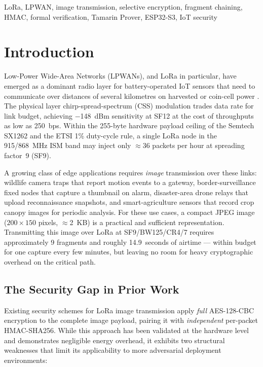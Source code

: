 \documentclass[journal]{IEEEtran}
\begin{document}
\begin{IEEEkeywords}
LoRa, LPWAN, image transmission, selective encryption, fragment chaining,
HMAC, formal verification, Tamarin Prover, ESP32-S3, IoT security
\end{IEEEkeywords}

\section{Introduction}
\label{sec:intro}

Low-Power Wide-Area Networks (LPWANs), and LoRa in particular, have emerged as
a dominant radio layer for battery-operated IoT sensors that need to communicate
over distances of several kilometres on harvested or coin-cell power
\cite{etsi_en300220}.  The physical layer chirp-spread-spectrum (CSS) modulation
trades data rate for link budget, achieving $-$148~dBm sensitivity at SF12 at
the cost of throughputs as low as 250~bps.  Within the 255-byte hardware payload
ceiling of the Semtech SX1262 \cite{semtech_sx1262} and the ETSI 1\%
duty-cycle rule, a single LoRa node in the 915/868~MHz ISM band may inject only
$\approx$36 packets per hour at spreading factor~9 (SF9).

A growing class of edge applications requires \emph{image} transmission over
these links: wildlife camera traps that report motion events to a gateway,
border-surveillance fixed nodes that capture a thumbnail on alarm, disaster-area
drone relays that upload reconnaissance snapshots, and smart-agriculture sensors
that record crop canopy images for periodic analysis.  For these use cases, a
compact JPEG image ($200 \times 150$ pixels, $\approx$2~KB) is a practical and
sufficient representation.  Transmitting this image over LoRa at SF9/BW125/CR4/7
requires approximately 9 fragments and roughly 14.9~seconds of airtime --- within
budget for one capture every few minutes, but leaving no room for heavy
cryptographic overhead on the critical path.

\subsection*{The Security Gap in Prior Work}

Existing security schemes for LoRa image transmission \cite{ryczek2025}
apply \emph{full} AES-128-CBC encryption to the complete image payload, pairing
it with \emph{independent} per-packet HMAC-SHA256.  While this approach has
been validated at the hardware level and demonstrates negligible energy overhead,
it exhibits two structural weaknesses that limit its applicability to more
adversarial deployment environments:
\end{document}
